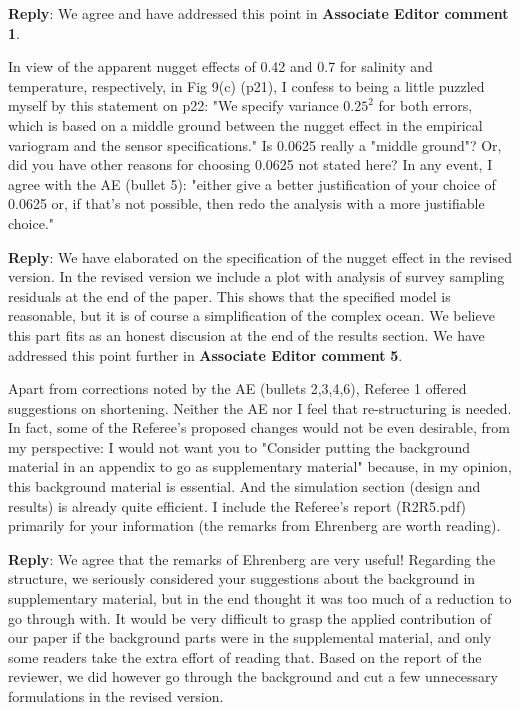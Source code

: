 \documentclass[a4paper]{article}
\newcounter{reviewer}
\def\aecom{\textbf{Associate Editor comment }}
\def\reply{\textbf{Reply}}
\begin{document}
\reply: We agree and have addressed this point in \aecom \textbf{1}. 
 
\vspace{5mm}
 In view of the apparent nugget effects of 0.42 and 0.7 for salinity
and temperature, respectively, in Fig 9(c) (p21), I confess to being
a little puzzled myself by this statement on p22:
"We specify variance $0.25^2$ for both errors, which is based on a
middle ground between the nugget effect in the empirical variogram
and the sensor specifications."  Is 0.0625 really a "middle ground"?
Or, did you have other reasons for choosing 0.0625 not stated here?
In any event, I agree with the AE (bullet 5): "either give a better
justification of your choice of 0.0625 or, if that’s not possible,
then redo the analysis with a more justifiable choice."

\vspace{5mm}
\reply: We have elaborated on the specification of the nugget effect in the revised version. In the revised version we include a plot with analysis of survey sampling residuals at the end of the paper. This shows that the specified model is reasonable, but it is of course a simplification of the complex ocean. We believe this part fits as an honest discusion at the end of the results section. We have addressed this point further in \aecom \textbf{5}. 

\vspace{5mm}
 Apart from corrections noted by the AE (bullets 2,3,4,6), Referee 1
offered suggestions on shortening. Neither the AE nor I feel that re-structuring is needed.  In fact, some of the Referee's proposed changes would not be even desirable, from my perspective: I would not want you to "Consider putting the background material in an appendix to go as supplementary material" because, in my opinion, this background material is essential. And the simulation section (design and results) is already quite efficient. I include the Referee's report (R2R5.pdf) primarily for your information (the remarks from Ehrenberg are worth reading).

\vspace{5mm}
\reply: We agree that the remarks of Ehrenberg are very useful! Regarding the structure, we seriously considered your suggestions about the background in supplementary material, but in the end thought it was too much of a reduction to go through with. It would be very difficult to grasp the applied contribution of our paper if the background parts were in the supplemental material, and only some readers take the extra effort of reading that. Based on the report of the reviewer, we did however go through the background and cut a few unnecessary formulations in the revised version.
\end{document}
